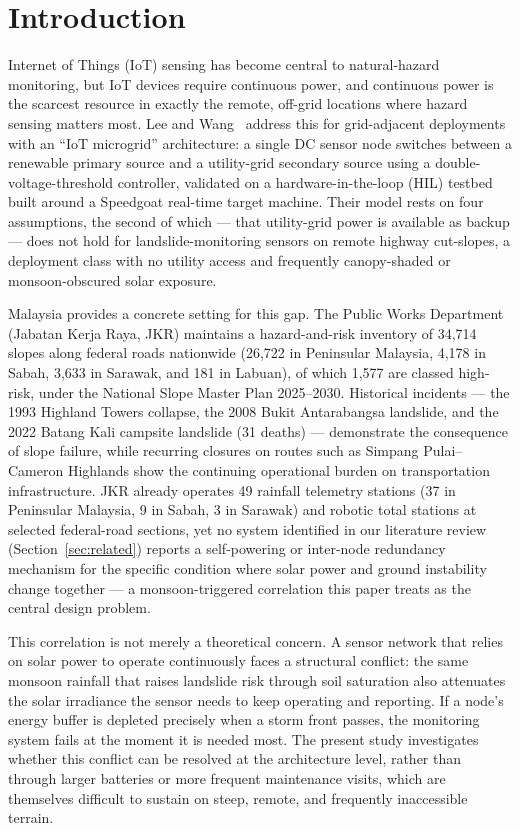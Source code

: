 \documentclass[electronics,article,submit,moreauthors]{Definitions/mdpi}
\begin{document}
\section{Introduction}

Internet of Things (IoT) sensing has become central to natural-hazard monitoring, but IoT devices require continuous power, and continuous power is the scarcest resource in exactly the remote, off-grid locations where hazard sensing matters most. Lee and Wang~\cite{ref101} address this for grid-adjacent deployments with an ``IoT microgrid'' architecture: a single DC sensor node switches between a renewable primary source and a utility-grid secondary source using a double-voltage-threshold controller, validated on a hardware-in-the-loop (HIL) testbed built around a Speedgoat real-time target machine. Their model rests on four assumptions, the second of which --- that utility-grid power is available as backup --- does not hold for landslide-monitoring sensors on remote highway cut-slopes, a deployment class with no utility access and frequently canopy-shaded or monsoon-obscured solar exposure.

Malaysia provides a concrete setting for this gap. The Public Works Department (Jabatan Kerja Raya, JKR) maintains a hazard-and-risk inventory of 34{,}714 slopes along federal roads nationwide (26{,}722 in Peninsular Malaysia, 4{,}178 in Sabah, 3{,}633 in Sarawak, and 181 in Labuan), of which 1{,}577 are classed high-risk, under the National Slope Master Plan 2025--2030. Historical incidents --- the 1993 Highland Towers collapse, the 2008 Bukit Antarabangsa landslide, and the 2022 Batang Kali campsite landslide (31 deaths) --- demonstrate the consequence of slope failure, while recurring closures on routes such as Simpang Pulai--Cameron Highlands show the continuing operational burden on transportation infrastructure. JKR already operates 49 rainfall telemetry stations (37 in Peninsular Malaysia, 9 in Sabah, 3 in Sarawak) and robotic total stations at selected federal-road sections, yet no system identified in our literature review (Section~\ref{sec:related}) reports a self-powering or inter-node redundancy mechanism for the specific condition where solar power and ground instability change together --- a monsoon-triggered correlation this paper treats as the central design problem.

This correlation is not merely a theoretical concern. A sensor network that relies on solar power to operate continuously faces a structural conflict: the same monsoon rainfall that raises landslide risk through soil saturation also attenuates the solar irradiance the sensor needs to keep operating and reporting. If a node's energy buffer is depleted precisely when a storm front passes, the monitoring system fails at the moment it is needed most. The present study investigates whether this conflict can be resolved at the architecture level, rather than through larger batteries or more frequent maintenance visits, which are themselves difficult to sustain on steep, remote, and frequently inaccessible terrain.
\end{document}
